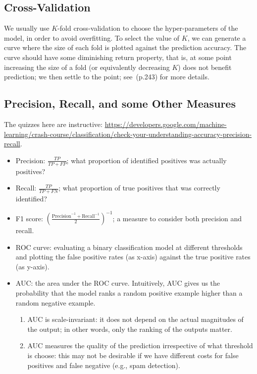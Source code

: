 \subsection{Cross-Validation}
    We usually use $K$-fold cross-validation to choose the hyper-parameters of the model, in order to avoid overfitting.
    To select the value of $K$, we can generate a curve where the size of each fold is plotted against the prediction accuracy. 
    The curve should have some diminishing return property, that is, at some point increasing the size of a fold (or equivalently decreasing $K$) does not benefit prediction; we then settle to the point; see~\cite{hastie2009elements}(p.243) for more details.



\subsection{Precision, Recall, and some Other Measures}
    The quizzes here are instructive: \url{https://developers.google.com/machine-learning/crash-course/classification/check-your-understanding-accuracy-precision-recall}.
    \begin{itemize}
        \item Precision: $\frac{TP}{TP + FP}$; what proportion of identified positives was actually positives?
        \item Recall: $\frac{TP}{TP + FN}$; what proportion of true positives that was correctly identified?
        \item F1 score: $\left( \frac{\text{Precision}^{-1} + \text{Recall}^{-1}}{2} \right)^{-1}$; a measure to consider both precision and recall.
        \item ROC curve: evaluating a binary classification model at different thresholds and plotting the false positive rates (as x-axis) against the true positive rates (as y-axis).
        \item AUC: the area under the ROC curve. Intuitively, AUC gives us the probability that the model ranks a random positive example higher than a random negative example.
            \begin{enumerate}
                \item AUC is scale-invariant: it does not depend on the actual magnitudes of the output; in other words, only the ranking of the outputs matter.
                \item AUC measures the quality of the prediction irrespective of what threshold is choose: this may not be desirable if we have different costs for false positives and false negative (e.g., spam detection).
            \end{enumerate}
    \end{itemize}


